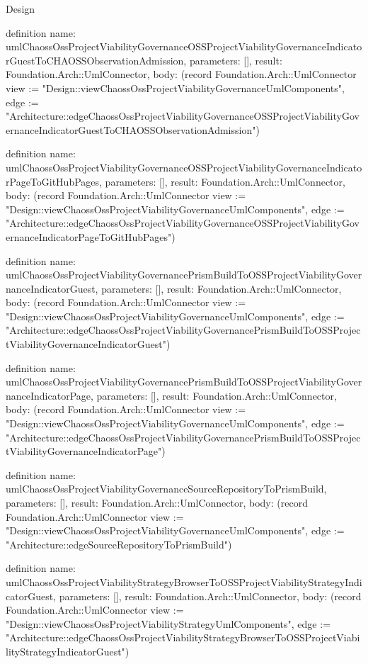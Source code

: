 \begin{lexlean}{Design}
\begin{semanticmodule}
definition{
  name: umlChaossOssProjectViabilityGovernanceOSSProjectViabilityGovernanceIndicatorGuestToCHAOSSObservationAdmission,
  parameters: [],
  result: Foundation.Arch::UmlConnector,
  body: (record Foundation.Arch::UmlConnector {view := "Design::viewChaossOssProjectViabilityGovernanceUmlComponents", edge := "Architecture::edgeChaossOssProjectViabilityGovernanceOSSProjectViabilityGovernanceIndicatorGuestToCHAOSSObservationAdmission"})
}

definition{
  name: umlChaossOssProjectViabilityGovernanceOSSProjectViabilityGovernanceIndicatorPageToGitHubPages,
  parameters: [],
  result: Foundation.Arch::UmlConnector,
  body: (record Foundation.Arch::UmlConnector {view := "Design::viewChaossOssProjectViabilityGovernanceUmlComponents", edge := "Architecture::edgeChaossOssProjectViabilityGovernanceOSSProjectViabilityGovernanceIndicatorPageToGitHubPages"})
}

definition{
  name: umlChaossOssProjectViabilityGovernancePrismBuildToOSSProjectViabilityGovernanceIndicatorGuest,
  parameters: [],
  result: Foundation.Arch::UmlConnector,
  body: (record Foundation.Arch::UmlConnector {view := "Design::viewChaossOssProjectViabilityGovernanceUmlComponents", edge := "Architecture::edgeChaossOssProjectViabilityGovernancePrismBuildToOSSProjectViabilityGovernanceIndicatorGuest"})
}

definition{
  name: umlChaossOssProjectViabilityGovernancePrismBuildToOSSProjectViabilityGovernanceIndicatorPage,
  parameters: [],
  result: Foundation.Arch::UmlConnector,
  body: (record Foundation.Arch::UmlConnector {view := "Design::viewChaossOssProjectViabilityGovernanceUmlComponents", edge := "Architecture::edgeChaossOssProjectViabilityGovernancePrismBuildToOSSProjectViabilityGovernanceIndicatorPage"})
}

definition{
  name: umlChaossOssProjectViabilityGovernanceSourceRepositoryToPrismBuild,
  parameters: [],
  result: Foundation.Arch::UmlConnector,
  body: (record Foundation.Arch::UmlConnector {view := "Design::viewChaossOssProjectViabilityGovernanceUmlComponents", edge := "Architecture::edgeSourceRepositoryToPrismBuild"})
}

definition{
  name: umlChaossOssProjectViabilityStrategyBrowserToOSSProjectViabilityStrategyIndicatorGuest,
  parameters: [],
  result: Foundation.Arch::UmlConnector,
  body: (record Foundation.Arch::UmlConnector {view := "Design::viewChaossOssProjectViabilityStrategyUmlComponents", edge := "Architecture::edgeChaossOssProjectViabilityStrategyBrowserToOSSProjectViabilityStrategyIndicatorGuest"})
}


\end{semanticmodule}
\end{lexlean}
